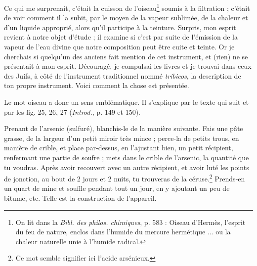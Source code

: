 \documentclass[a4paper, 11pt, oneside, polutonikogreek, french]{article}
\begin{document}
Ce qui me surprenait, c'était la cuisson de l'oiseau\footnote{On lit dans la \emph{Bibl. des philos. chimiques}, p. 583 : Oiseau d'Hermès, l'esprit du feu de nature, enclos dans l'humide du mercure hermétique ... ou la chaleur naturelle unie à l'humide radical.  } soumis à la filtration ; c'était de voir comment il la subit, par le moyen de la vapeur sublimée, de la chaleur et d'un liquide approprié, alors qu'il participe à la teinture. Surpris, mon esprit revient à notre objet d'étude ; il examine si c'est par suite de l'émission de la vapeur de l'eau divine que notre composition peut être cuite et teinte. Or je cherchais si quelqu'un des anciens fait mention de cet instrument, et (rien) ne se présentait à mon esprit. Découragé, je compulsai les livres et je trouvai dans ceux des Juifs, à côté de l'instrument traditionnel nommé \emph{tribicos}, la description de ton propre instrument. Voici comment la chose est présentée.

Le mot oiseau a donc un sens emblématique. Il s'explique par le texte qui suit et par les fig. 25, 26, 27 (\emph{Introd.}, p. 149 et 150).

Prenant de l'arsenic (sulfuré), blanchis-le de la manière suivante. Fais une pâte grasse, de la largeur d'un petit miroir très mince ; perce-la de petits trous, en manière de crible, et place par-dessus, en l'ajustant bien, un petit récipient, renfermant une partie de soufre ; mets dans le crible de l'arsenic, la quantité que tu voudras. Après avoir recouvert avec un autre récipient, et avoir luté les points de jonction, au bout de 2 jours et 2 nuits, tu trouveras de la céruse.\footnote{Ce mot semble signifier ici l'acide arsénieux.} Prends-en un quart de mine et souffle pendant tout un jour, en y ajoutant un peu de bitume, etc. Telle est la construction de l'appareil.
\end{document}

